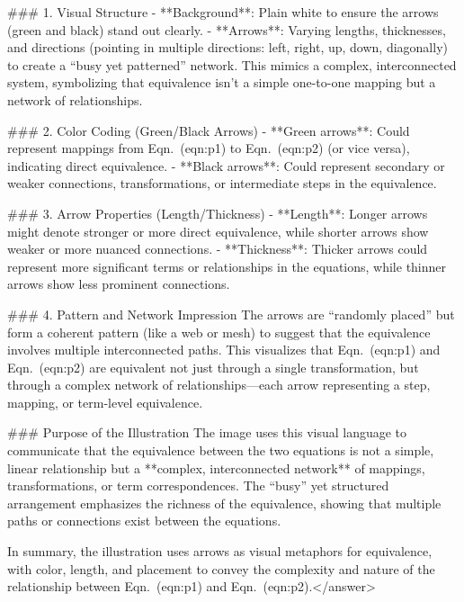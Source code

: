 ### 1. Visual Structure  
- **Background**: Plain white to ensure the arrows (green and black) stand out clearly.  
- **Arrows**: Varying lengths, thicknesses, and directions (pointing in multiple directions: left, right, up, down, diagonally) to create a “busy yet patterned” network. This mimics a complex, interconnected system, symbolizing that equivalence isn’t a simple one-to-one mapping but a network of relationships.  


### 2. Color Coding (Green/Black Arrows)  
- **Green arrows**: Could represent mappings from Eqn.~(eqn:p1) to Eqn.~(eqn:p2) (or vice versa), indicating direct equivalence.  
- **Black arrows**: Could represent secondary or weaker connections, transformations, or intermediate steps in the equivalence.  


### 3. Arrow Properties (Length/Thickness)  
- **Length**: Longer arrows might denote stronger or more direct equivalence, while shorter arrows show weaker or more nuanced connections.  
- **Thickness**: Thicker arrows could represent more significant terms or relationships in the equations, while thinner arrows show less prominent connections.  


### 4. Pattern and Network Impression  
The arrows are “randomly placed” but form a coherent pattern (like a web or mesh) to suggest that the equivalence involves multiple interconnected paths. This visualizes that Eqn.~(eqn:p1) and Eqn.~(eqn:p2) are equivalent not just through a single transformation, but through a complex network of relationships—each arrow representing a step, mapping, or term-level equivalence.  


### Purpose of the Illustration  
The image uses this visual language to communicate that the equivalence between the two equations is not a simple, linear relationship but a **complex, interconnected network** of mappings, transformations, or term correspondences. The “busy” yet structured arrangement emphasizes the richness of the equivalence, showing that multiple paths or connections exist between the equations.  


In summary, the illustration uses arrows as visual metaphors for equivalence, with color, length, and placement to convey the complexity and nature of the relationship between Eqn.~(eqn:p1) and Eqn.~(eqn:p2).</answer>